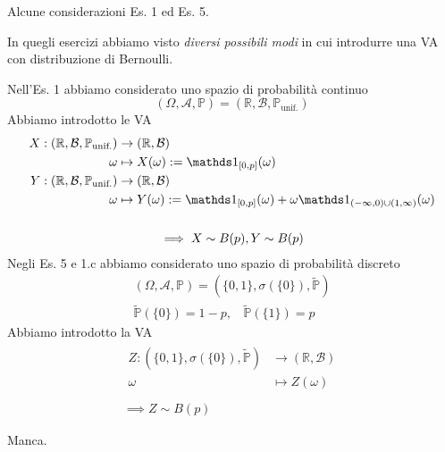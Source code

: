 \begin{oss}
Alcune considerazioni Es. 1 ed Es. 5.

In quegli esercizi abbiamo visto \textit{diversi possibili modi} in cui introdurre una VA con distribuzione di Bernoulli.

Nell'Es. 1 abbiamo considerato uno spazio di probabilità continuo
\begin{equation*}
( \Omega ,\mathcal{A} ,\mathbb{P}) =(\mathbb{R} ,\mathcal{B} ,\mathbb{P}_{\text{unif.}})
\end{equation*}
Abbiamo introdotto le VA
\begin{gather*}
\begin{aligned}
X:(\mathbb{R} ,\mathcal{B} ,\mathbb{P}_{\text{unif.}}) & \rightarrow (\mathbb{R} ,\mathcal{B})\\
\omega  & \mapsto X( \omega ) :=\Ind_{[ 0,p]}( \omega )\\
Y:(\mathbb{R} ,\mathcal{B} ,\mathbb{P}_{\text{unif.}}) & \rightarrow (\mathbb{R} ,\mathcal{B})\\
\omega  & \mapsto Y( \omega ) :=\Ind_{[ 0,p]}( \omega ) +\omega \Ind_{( -\infty ,0) \cup ( 1,\infty )}( \omega )
\end{aligned}\\
\ \\
\implies X\sim B( p) ,Y\sim B( p)
\end{gather*}
Negli Es. 5 e 1.c abbiamo considerato uno spazio di probabilità discreto
\begin{gather*}
( \Omega ,\mathcal{A} ,\mathbb{P}) =\left(\{0,1\} ,\sigma (\{0\}) ,\tilde{\mathbb{P}}\right)\\
\tilde{\mathbb{P}}(\{0\}) =1-p,\ \ \ \ \tilde{\mathbb{P}}(\{1\}) =p
\end{gather*}
Abbiamo introdotto la VA
\begin{gather*}
\begin{aligned}
Z:\left(\{0,1\} ,\sigma (\{0\}) ,\tilde{\mathbb{P}}\right) & \rightarrow (\mathbb{R} ,\mathcal{B})\\
\omega  & \mapsto Z( \omega )
\end{aligned}\\
\\
\implies Z\sim B( p)
\end{gather*}
\end{oss}
\Soluzione

Manca.
\Soluzione

